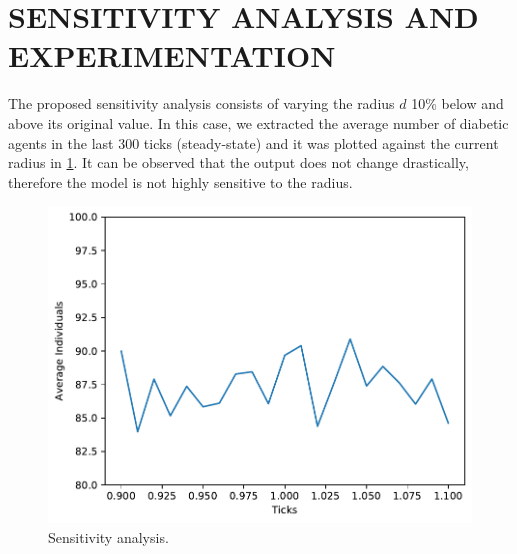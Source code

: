 \section{SENSITIVITY ANALYSIS AND EXPERIMENTATION}
The proposed sensitivity analysis consists of varying the radius $d$ 10\% below and above its original value. In this case, we extracted the average number of diabetic agents in the last 300 ticks (steady-state) and it was plotted against the current radius in \cref{fig:sens}. It can be observed that the output does not change drastically, therefore the model is not highly sensitive to the radius.
\begin{figure}[H]
    \centering
    \includegraphics[width=0.3\columnwidth]{files/sensitivity-diabetes.pdf}
    \caption{Sensitivity analysis.}
    \label{fig:sens}
\end{figure}
